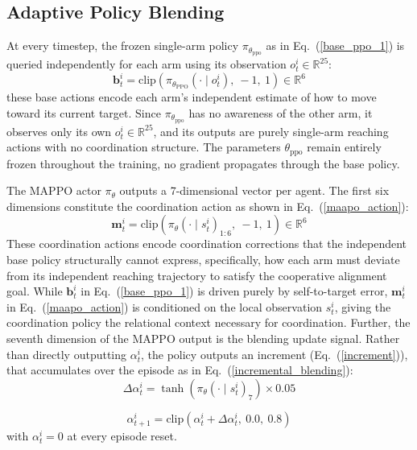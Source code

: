 \documentclass[a4paper,fleqn]{cas-dc}
\begin{document}
\subsection{Adaptive Policy Blending}
\label{HR_blending}
At every timestep, the frozen single-arm policy $\pi_{\theta_{\text{ppo}}}$ as in Eq.~(\ref{base_ppo_1}) is queried independently for each arm using its observation $o_t^i \in \mathbb{R}^{25}$:
\begin{equation}
\mathbf{b}_t^i = \mathrm{clip}\left( \pi_{\theta_{\text{PPO}}}(\cdot \mid o_t^i),\ -1,\ 1 \right) \in \mathbb{R}^6
\label{base_ppo_1}
\end{equation}
these base actions encode each arm's independent estimate of how to move toward its current target. Since $\pi_{\theta_{\text{ppo}}}$ has no awareness of the other arm, it observes only its own $o_t^i \in \mathbb{R}^{25}$, and its outputs are purely single-arm reaching actions with no coordination structure. The parameters $\theta_{\text{ppo}}$ remain entirely frozen throughout the training, no gradient propagates through the base policy.

The MAPPO actor $\pi_\theta$ outputs a 7-dimensional vector per agent. The first six dimensions constitute the coordination action as shown in Eq.~(\ref{maapo_action}):
\begin{equation}
\mathbf{m}_t^i = \mathrm{clip}\left( \pi_{\theta}(\cdot \mid s_t^i)_{1:6},\ -1,\ 1 \right) \in \mathbb{R}^6
\label{maapo_action}
\end{equation}
These coordination actions encode coordination corrections that the independent base policy structurally cannot express, specifically, how each arm must deviate from its independent reaching trajectory to satisfy the cooperative alignment goal. While $\mathbf{b}_t^i$ in Eq.~(\ref{base_ppo_1}) is driven purely by self-to-target error, $\mathbf{m}_t^i$ in Eq.~(\ref{maapo_action}) is conditioned on the local observation $s_t^i$, giving the coordination policy the relational context necessary for coordination. Further, the seventh dimension of the MAPPO output is the blending update signal. Rather than directly outputting $\alpha_t^i$, the policy outputs an increment (Eq.~(\ref{increment})), that accumulates over the episode as in Eq.~(\ref{incremental_blending}):
\begin{equation}
\Delta \alpha_t^i = \tanh\left( \pi_{\theta}(\cdot \mid s_t^i)_{7} \right) \times 0.05
\label{increment}
\end{equation}

\begin{equation}
\alpha_{t+1}^i = \mathrm{clip}\left( \alpha_t^i + \Delta \alpha_t^i,\ 0.0,\ 0.8 \right)
\label{incremental_blending}
\end{equation}
with $\alpha_t^i = 0$ at every episode reset.
\end{document}
